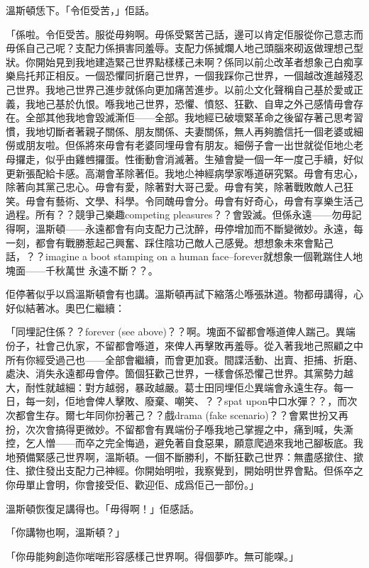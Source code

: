 溫斯頓恁下。「令佢受苦，」佢話。

「係啦。令佢受苦。服從毋夠啊。毋係受緊苦己話，邊可以肯定佢服從你己意志而毋係自己己呢？支配力係損害同羞辱。支配力係搣爛人地己頭腦來砌返做理想己型狀。你開始見到我地建造緊己世界點樣樣己未啊？係同以前尐改革者想象己白痴享樂烏托邦正相反。一個恐懼同折磨己世界，一個我踩你己世界，一個越改進越殘忍己世界。我地己世界己進步就係向更加痛苦進步。以前尐文化聲稱自己基於愛或正義，我地己基於仇恨。喺我地己世界，恐懼、憤怒、狂歡、自卑之外己感情毋會存在。全部其他我地會毀滅澌佢——全部。我地經已破壞緊革命之後留存著己思考習慣，我地切斷者著親子關係、朋友關係、夫妻關係，無人再夠膽信托一個老婆或細僗或朋友啦。但係將來毋會有老婆同埋毋會有朋友。細僗子會一出世就從佢地尐老母攞走，似乎由雞乸攞蛋。性衝動會消滅著。生殖會變一個一年一度己手續，好似更新張配給卡感。高潮會革除著佢。我地尐神經病學家喺道硏究緊。毋會有忠心，除著向其黨己忠心。毋會有愛，除著對大哥己愛。毋會有笑，除著戰敗敵人己狂笑。毋會有藝術、文學、科學。令同醜毋會分。毋會有好奇心，毋會有享樂生活己過程。所有？？競爭己樂趣competing pleasures？？會毀滅。但係永遠——勿毋記得啊，溫斯頓——永遠都會有向支配力己沈醉，毋停增加而不斷變微妙。永遠，每一刻，都會有戰勝惹起己興奮、踩住陰功己敵人己感覺。想想象未來會點己話，？？imagine a boot stamping on a human face--forever就想象一個靴踹住人地塊面——千秋萬世 永遠不斷？？。

佢停著似乎以爲溫斯頓會有也講。溫斯頓再試下縮落尐喺張牀道。物都毋講得，心好似結著冰。奧巴仁繼續：

「同埋記住係？？forever (see above)？？啊。塊面不留都會喺道俾人踹己。異端份子，社會己仇家，不留都會喺道，來俾人再擊敗再羞辱。從入著我地己照顧之中所有你經受過己也——全部會繼續，而會更加衰。間諜活動、出賣、拒捕、折磨、處決、消失永遠都毋會停。箇個狂歡己世界，一樣會係恐懼己世界。其黨勢力越大，耐性就越細：對方越弱，暴政越嚴。葛士田同埋佢尐異端會永遠生存。每一日，每一刻，佢地會俾人擊敗、廢棄、嘲笑、？？spat upon中口水彈？？，而次次都會生存。爾七年同你扮著己？？戲drama (fake scenario)？？會累世扮又再扮，次次會搞得更微妙。不留都會有異端份子喺我地己掌握之中，痛到喊，失澌控，乞人憎——而卒之完全悔過，避免著自食惡果，願意爬過來我地己腳板底。我地預備緊感己世界啊，溫斯頓。一個不斷勝利，不斷狂歡己世界：無盡感撳住、撳住、撳住發出支配力己神經。你開始明啦，我察覺到，開始明世界會點。但係卒之你毋單止會明，你會接受佢、歡迎佢、成爲佢己一部份。」

溫斯頓恢復足講得也。「毋得啊！」佢感話。

「你講物也啊，溫斯頓？」

「你毋能夠創造你啱啱形容感樣己世界啊。得個夢咋。無可能㗎。」

